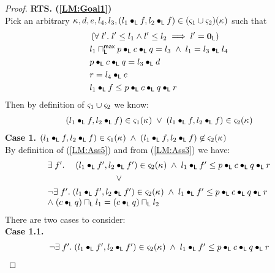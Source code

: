 \begin{lemma}[]
\begin{proof}
\noindent\textbf{RTS. (\ref{LM:Goal1})}\\
Pick an arbitrary $\kappa_{}, d, e, l_4, l_3, (l_1 \bullet_{\textsf{L}} f, l_2 \bullet_{\textsf{L}} f) \in (\varsigma_{1} \cup \varsigma_{2})(\kappa_{})$ such that
\begin{align}
	& \left(\forall\; l'.\; l' \leq l_1 \land l' \leq l_2 \implies l' = \mathbf{0}_{\textsf{L}}\right)\label{LM:Ass47}\\
	& l_1 \sqcap_{\textsf{L}}^{\textsf{max}}  p \bullet_{\textsf{L}} c \bullet_{\textsf{L}} q = l_3 \;\land\; l_1 = l_3 \bullet_{\textsf{L}} l_4 \label{LM:Ass48}\\
	& p \bullet_{\textsf{L}} c \bullet_{\textsf{L}} q = l_3 \bullet_{\textsf{L}} d \label{LM:Ass49}\\
	& r = l_4 \bullet_{\textsf{L}} e \label{LM:Ass50}\\
	& l_1 \bullet_{\textsf{L}} f \leq p \bullet_{\textsf{L}} c \bullet_{\textsf{L}} q \bullet_{\textsf{L}} r \label{LM:Ass51}
\end{align}
%
Then by definition of $\varsigma_{1} \cup \varsigma_{2}$ we know:
%
\begin{align}
	(l_1 \bullet_{\textsf{L}} f, l_2 \bullet_{\textsf{L}} f) \in \varsigma_{1}(\kappa_{}) \;\lor\; (l_1 \bullet_{\textsf{L}} f, l_2 \bullet_{\textsf{L}} f) \in \varsigma_{2}(\kappa_{}) \label{LM:Ass61}
\end{align}
%
\textbf{Case 1.} $(l_1 \bullet_{\textsf{L}} f, l_2 \bullet_{\textsf{L}} f) \in \varsigma_{1}(\kappa_{}) \;\land\; (l_1 \bullet_{\textsf{L}} f, l_2 \bullet_{\textsf{L}} f) \not\in \varsigma_{2}(\kappa_{})$\\
%
By definition of (\ref{LM:Ass5}) and from (\ref{LM:Ass3}) we have:
%
\begin{align}
	& \begin{array}{l l}
		\exsts{f'}& (l_1 \composeL f', l_2 \composeL f') \in \amod{2}(\ca{}) \;\land\; l_1 \composeL f' \leq p \composeL c \composeL q \composeL r \\
	\end{array}\label{LM:Ass62}\\
	& \hspace*{3cm}\lor\; \nonumber\\
	&\begin{array}{l l}
		\neg\exsts{f'} (l_1 \composeL f', l_2 \composeL f') \in \amod{2}(\ca{}) \;\land\; l_1 \composeL f' \leq p \composeL c \composeL q \composeL r \\
		\land\; (c \composeL q) \meetL l_1 = (c \composeL q) \meetL l_2
	\end{array}  \label{LM:Ass63}
\end{align}
%
There are two cases to consider:\\
\textbf{Case 1.1.} 
\[
\begin{array}{l}
		\neg\exists\; f'.\; (l_1 \bullet_{\textsf{L}} f', l_2 \bullet_{\textsf{L}} f') \in \varsigma_{2}(\kappa_{}) \;\land\; l_1 \bullet_{\textsf{L}} f' \leq p \bullet_{\textsf{L}} c \bullet_{\textsf{L}} q \bullet_{\textsf{L}} r \\


\end{array}\]
\end{proof}
\end{lemma}
